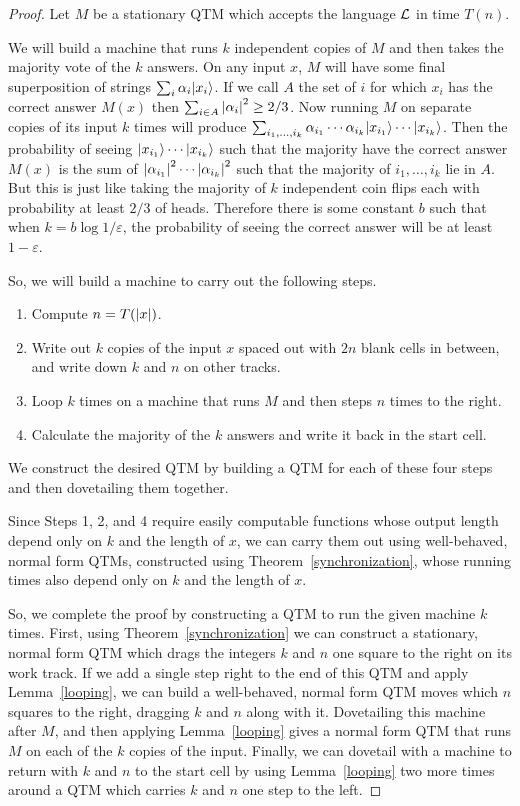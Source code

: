 \begin{proof}
Let $M$ be a stationary QTM which accepts the language ${\cal L}$ in time
$T(n)$.

We will build a machine that runs $k$ independent copies of $M$
and then takes the \mbox{majority} vote of the $k$ answers.
On any input $x$, $M$ will have some final superposition of strings
$\sum_{i} \alpha_i {| x_i \rangle}$.  If we call $A$ the set of $i$
for which $x_i$ has the correct answer $M(x)$
then $\sum_{i \in A} {\left| \alpha_i \right|}^2 \geq 2/3$.
Now running $M$ on separate copies of its input $k$ times will produce
$\sum_{i_1,\ldots,i_k} \alpha_{i_1} \cdots \alpha_{i_k} {| x_{i_1} \rangle} \cdots
{| x_{i_k} \rangle}$. Then the probability of seeing ${| x_{i_1} \rangle} \cdots
{| x_{i_k} \rangle}$ such that the majority have the correct answer $M(x)$ is the sum
of ${\left| \alpha_{i_1} \right|}^2 \cdots {\left| \alpha_{i_k} \right|}^2$ such that
the majority of $i_1,\ldots,i_k$ lie in $A$.  But this is just
like taking the majority of $k$ independent coin flips each with probability
at least $2/3$ of heads.  Therefore there is some constant
$b$ such that when $k = b \log 1/\varepsilon$, the probability
of seeing the correct answer will be at least $1 - \varepsilon$.

So, we will build a machine to carry out the following steps.

\begin{enumerate}
\item Compute $n = T({|x|})$.
\item Write out $k$ copies of the input $x$ spaced out with $2n$ blank
cells in between, and write down $k$ and $n$ on other tracks.
\item Loop $k$ times on a machine that runs $M$ and then steps $n$ times to
the right.
\item Calculate the majority of the $k$ answers and write it back in the
start cell.
\end{enumerate}

We construct the desired QTM by building
a QTM for each of these four steps and then dovetailing them together.

Since Steps 1, 2, and 4 require easily computable functions whose output length
depend only on $k$ and the length of $x$,
we can carry them out using well-behaved, normal form QTMs,
constructed using Theorem~\ref{synchronization}, whose running times
also depend only on $k$ and the length of $x$.

So, we complete the proof by constructing a QTM to run the given machine $k$
times. First, using Theorem~\ref{synchronization} we can construct a
stationary, normal form QTM which drags the integers $k$ and $n$ one square to
the right on its work track. If we add a single step right to the end of this
QTM and apply Lemma~\ref{looping}, we can build a well-behaved, normal form QTM
moves which $n$ squares to the right, dragging $k$ and $n$ along with it.
Dovetailing this machine after $M$, and then applying Lemma~\ref{looping}
gives a normal form QTM that runs $M$ on each of the $k$ copies of the input.
Finally, we can dovetail with a machine to return with $k$ and $n$ to the start
cell by using Lemma~\ref{looping} two more times around a QTM which carries $k$
and $n$ one step to the left.
\end{proof}

